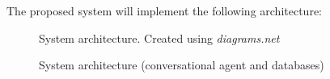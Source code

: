 \documentclass[12pt,english]{article}
\begin{document}
The proposed system will implement the following architecture:
\begin{figure}[H]
    \caption{System architecture. Created using \emph{diagrams.net} \protect\cite{drawio}}
\end{figure}

\begin{figure}[H]
    \caption{System architecture (conversational agent and databases)}
\end{figure}
\end{document}
